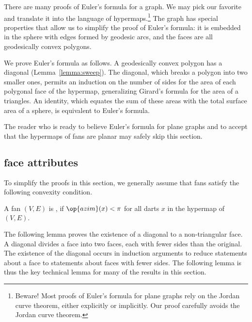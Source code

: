 There are many proofs of Euler's formula for a graph.  We may pick our
favorite and translate it into the language of
hypermaps.\footnote{Beware!  Most proofs of Euler's formula for plane
  graphs rely on the Jordan curve theorem, either explicitly or
  implicitly.  Our proof carefully avoids the Jordan curve theorem.}
The graph has special properties that allow us to simplify the proof
of Euler's formula: it is embedded in the sphere with edges formed by
geodesic arcs, and the faces are all geodesically convex polygons.

We prove Euler's formula as follows.  A geodesically convex polygon
has a diagonal (Lemma~\ref{lemma:sweep}).  The diagonal, which breaks
a polygon into two smaller ones, permits an induction on the number of
sides for the area of each polygonal face of the hypermap,
generalizing Girard's formula for the area of a triangles.  An identity, which
equates the sum of these areas with the total surface area of a sphere, is
equivalent to Euler's formula.


The reader who is ready to believe Euler's formula for plane graphs
and to accept that the hypermaps of fans are planar may safely skip
this section.

\subsection{face attributes}

To simplify the proofs in this section,  we generally assume that fans 
satisfy the following  convexity condition.

\begin{definition}
A fan $(V,E)$ is , if $\op{azim}(x)<\pi$
for all darts $x$ in the hypermap of $(V,E)$.
\end{definition}
%

The following lemma proves the existence of a diagonal to a non-triangular
face.  A diagonal  divides a face into two faces, each with fewer sides
than the original.  The existence of the diagonal occurs in induction arguments
to reduce statements about a face to statements about faces with fewer sides.
The following lemma is thus the key technical lemma for many of the results
in this section.

